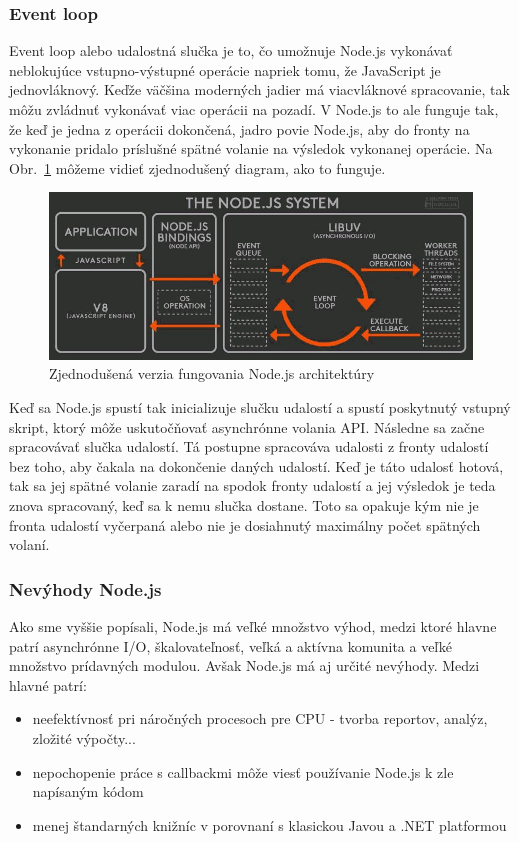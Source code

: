 \subsubsection{Event loop}
\indent Event loop alebo udalostná slučka je to, čo umožnuje Node.js vykonávať neblokujúce vstupno-výstupné operácie napriek tomu, že JavaScript je jednovláknový. Keďže väčšina moderných jadier má viacvláknové spracovanie, tak môžu zvládnuť vykonávať viac operácii na pozadí. V Node.js to ale funguje tak, že keď je jedna z operácii dokončená, jadro povie Node.js, aby do fronty na vykonanie pridalo príslušné spätné volanie na výsledok vykonanej operácie. Na Obr.~\ref{fig:event_loop} môžeme vidieť zjednodušený diagram, ako to funguje. 

\begin{figure}[H]
    \centering
    \includegraphics[scale=0.55]{img/evet_loop.jpg}
    \caption{Zjednodušená verzia fungovania Node.js architektúry}
    \label{fig:event_loop}
\end{figure}

\indent Keď sa Node.js spustí tak inicializuje slučku udalostí a spustí poskytnutý vstupný skript, ktorý môže uskutočňovať asynchrónne volania API. Následne sa začne spracovávať slučka udalostí. Tá postupne spracováva udalosti z fronty udalostí bez toho, aby čakala na dokončenie daných udalostí. Keď je táto udalosť hotová, tak sa jej spätné volanie zaradí na spodok fronty udalostí a jej výsledok je teda znova spracovaný, keď sa k nemu slučka dostane. Toto sa opakuje kým nie je fronta udalostí vyčerpaná alebo nie je dosiahnutý maximálny počet spätných volaní. 

\subsubsection{Nevýhody Node.js}
\indent Ako sme vyššie popísali, Node.js má veľké množstvo výhod, medzi ktoré hlavne patrí asynchrónne I/O, škalovateľnosť, veľká a aktívna komunita a veľké množstvo prídavných modulou. Avšak Node.js má aj určité nevýhody. Medzi hlavné patrí:
\begin{itemize}
    \item neefektívnosť pri náročných procesoch pre CPU - tvorba reportov, analýz, zložité výpočty... 
    \item nepochopenie práce s callbackmi môže viesť používanie Node.js k zle napísaným kódom
    \item menej štandarných knižníc v porovnaní s klasickou Javou a .NET platformou
\end{itemize}

